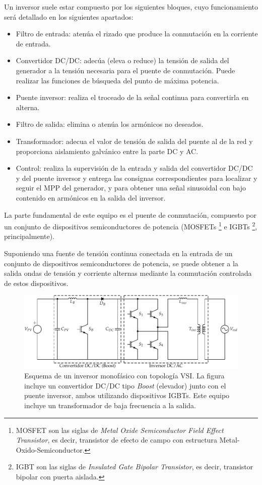 Un inversor suele estar compuesto por los siguientes bloques, cuyo
funcionamiento será detallado en los siguientes apartados: 
\begin{itemize}
\item Filtro de entrada: atenúa el rizado que produce la conmutación en
la corriente de entrada.
\item Convertidor DC/DC: adecúa (eleva o reduce) la tensión de salida del
generador a la tensión necesaria para el puente de conmutación. Puede
realizar las funciones de búsqueda del punto de máxima potencia.
\item Puente inversor: realiza el troceado de la señal continua para
convertirla en alterna.
\item Filtro de salida: elimina o atenúa los armónicos no deseados.
\item Transformador: adecua el valor de tensión de salida del puente al
de la red y proporciona aislamiento galvánico entre la parte DC y
AC.
\item Control: realiza la supervisión de la entrada y salida del convertidor
DC/DC y del puente inversor y entrega las consignas correspondientes
para localizar y seguir el MPP del generador, y para obtener una señal
sinusoidal con bajo contenido en armónicos en la salida del inversor.
\end{itemize}
La parte fundamental de este equipo es el puente de conmutación, compuesto
por un conjunto de dispositivos semiconductores de potencia (MOSFETs%
\footnote{MOSFET son las siglas de \emph{Metal Oxide Semiconductor Field Effect
Transistor}, es decir, transistor de efecto de campo con estructura
Metal-Oxido-Semiconductor.%
} e IGBTs%
\footnote{IGBT son las siglas de \emph{Insulated Gate Bipolar Transistor}, es
decir, transistor bipolar con puerta aislada. %
}, principalmente).

Suponiendo una fuente de tensión continua conectada en la entrada
de un conjunto de dispositivos semiconductores de potencia, se puede
obtener a la salida ondas de tensión y corriente alternas mediante
la conmutación controlada de estos dispositivos. 

%
\begin{figure}


\includegraphics[scale=0.9]{../figs/InversorPV}

\caption[Esquema de un inversor monofásico con topología VSI]{\label{fig:InversorMonofasicoVSI}Esquema de un inversor monofásico
con topología VSI. La figura incluye un convertidor DC/DC tipo \emph{Boost}
(elevador) junto con el puente inversor, ambos utilizando dispositivos
IGBTs. Este equipo incluye un transformador de baja frecuencia a la
salida.}

\end{figure}


